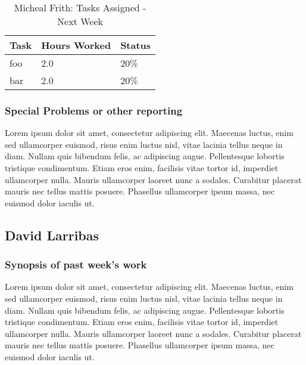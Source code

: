 \documentclass[12pt,article,compsoc]{IEEEtran}
\begin{document}
	\begin{table}[ht]
	\renewcommand{\arraystretch}{1.3}
		\caption{Micheal Frith: Tasks Assigned - Next Week}
		
		\label{Summary of Micheal Frith's activities: this week}
		
		\centering
		\begin{tabular}{p{5.5cm}|p{1cm}|p{1cm}}
		\hline
		\bfseries 	Task		 		& \bfseries Hours Worked	& \bfseries Status	\\
		\hline\hline
					foo					& 2.0						& 20\%				\\	%
					bar					& 2.0						& 20\%				\\	
		\hline
		\end{tabular}
	\end{table}

	\subsubsection*{Special Problems or other reporting}
	Lorem ipsum dolor sit amet, consectetur adipiscing elit. Maecenas luctus, enim sed ullamcorper euismod, risus enim luctus nisl, vitae lacinia tellus neque in diam. Nullam quis bibendum felis, ac adipiscing augue. Pellentesque lobortis tristique condimentum. Etiam eros enim, facilisis vitae tortor id, imperdiet ullamcorper nulla. Mauris ullamcorper laoreet nunc a sodales. Curabitur placerat mauris nec tellus mattis posuere. Phasellus ullamcorper ipsum massa, nec euismod dolor iaculis ut.
	\clearpage

\subsection{David Larribas}

	\subsubsection*{Synopsis of past week's work}

	Lorem ipsum dolor sit amet, consectetur adipiscing elit. Maecenas luctus, enim sed ullamcorper euismod, risus enim luctus nisl, vitae lacinia tellus neque in diam. Nullam quis bibendum felis, ac adipiscing augue. Pellentesque lobortis tristique condimentum. Etiam eros enim, facilisis vitae tortor id, imperdiet ullamcorper nulla. Mauris ullamcorper laoreet nunc a sodales. Curabitur placerat mauris nec tellus mattis posuere. Phasellus ullamcorper ipsum massa, nec euismod dolor iaculis ut.
\end{document}

